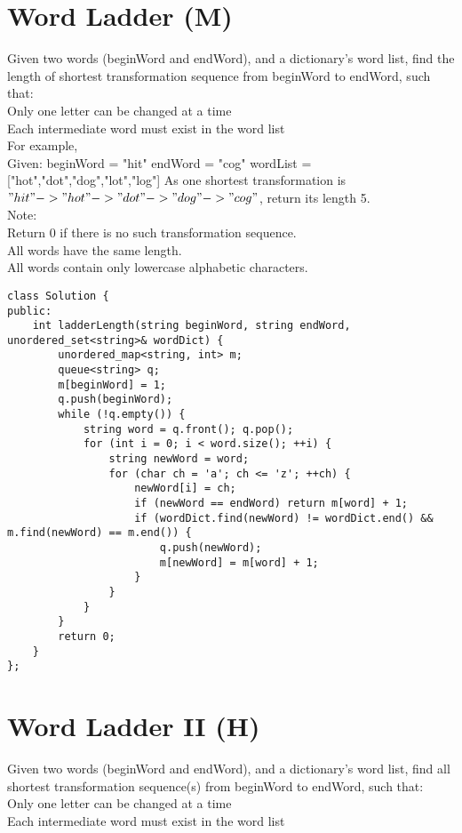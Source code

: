 \section{Word Ladder (M)}
Given two words (beginWord and endWord), and a dictionary's word list, find the length of shortest transformation sequence from beginWord to endWord, such that:\\
    Only one letter can be changed at a time\\
    Each intermediate word must exist in the word list\\

For example,\\
Given:
beginWord = "hit"
endWord = "cog"
wordList = ["hot","dot","dog","lot","log"]
As one shortest transformation is $"hit" -> "hot" -> "dot" -> "dog" -> "cog"$,
return its length 5.\\

Note:\\
    Return 0 if there is no such transformation sequence.\\
    All words have the same length.\\
    All words contain only lowercase alphabetic characters.\

\begin{lstlisting}
class Solution {
public:
    int ladderLength(string beginWord, string endWord, unordered_set<string>& wordDict) {
        unordered_map<string, int> m;
        queue<string> q;
        m[beginWord] = 1;
        q.push(beginWord);
        while (!q.empty()) {
            string word = q.front(); q.pop();
            for (int i = 0; i < word.size(); ++i) {
                string newWord = word;
                for (char ch = 'a'; ch <= 'z'; ++ch) {
                    newWord[i] = ch;
                    if (newWord == endWord) return m[word] + 1;
                    if (wordDict.find(newWord) != wordDict.end() && m.find(newWord) == m.end()) {
                        q.push(newWord);
                        m[newWord] = m[word] + 1;
                    }   
                }
            }
        }
        return 0;
    }
};
\end{lstlisting}


\section{Word Ladder II (H)}
Given two words (beginWord and endWord), and a dictionary's word list, find all shortest transformation sequence(s) from beginWord to endWord, such that:\\
    Only one letter can be changed at a time\\
    Each intermediate word must exist in the word list\\

